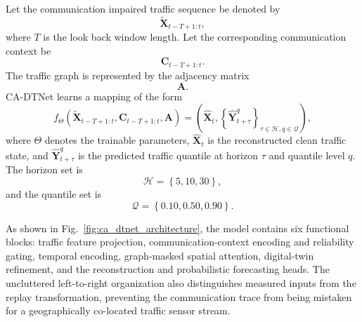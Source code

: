 \documentclass[pdflatex,sn-mathphys-num]{sn-jnl}%
\theoremstyle{thmstyleone}%
\theoremstyle{thmstyletwo}%
\theoremstyle{thmstylethree}%
\begin{document}
Let the communication impaired traffic sequence be denoted by
\begin{equation}
    \widetilde{\mathbf{X}}_{t-T+1:t},
\end{equation}
where \(T\) is the look back window length. Let the corresponding communication context be
\begin{equation}
    \mathbf{C}_{t-T+1:t}.
\end{equation}
The traffic graph is represented by the adjacency matrix
\begin{equation}
    \mathbf{A}.
\end{equation}
CA-DTNet learns a mapping of the form
\begin{equation}
    f_{\Theta}
    \left(
    \widetilde{\mathbf{X}}_{t-T+1:t},
    \mathbf{C}_{t-T+1:t},
    \mathbf{A}
    \right)
    =
    \left(
    \widehat{\mathbf{X}}_{t},
    \left\{
    \widehat{\mathbf{Y}}_{t+\tau}^{q}
    \right\}_{\tau\in\mathcal{H}, q\in\mathcal{Q}}
    \right),
\end{equation}
where \(\Theta\) denotes the trainable parameters, \(\widehat{\mathbf{X}}_{t}\) is the reconstructed clean traffic state, and \(\widehat{\mathbf{Y}}_{t+\tau}^{q}\) is the predicted traffic quantile at horizon \(\tau\) and quantile level \(q\). The horizon set is
\begin{equation}
    \mathcal{H} = \left\{5, 10, 30\right\},
\end{equation}
and the quantile set is
\begin{equation}
    \mathcal{Q} = \left\{0.10, 0.50, 0.90\right\}.
\end{equation}

As shown in Fig.~\ref{fig:ca_dtnet_architecture}, the model contains six functional blocks: traffic feature projection, communication-context encoding and reliability gating, temporal encoding, graph-masked spatial attention, digital-twin refinement, and the reconstruction and probabilistic forecasting heads. The uncluttered left-to-right organization also distinguishes measured inputs from the replay transformation, preventing the communication trace from being mistaken for a geographically co-located traffic sensor stream.
\end{document}
